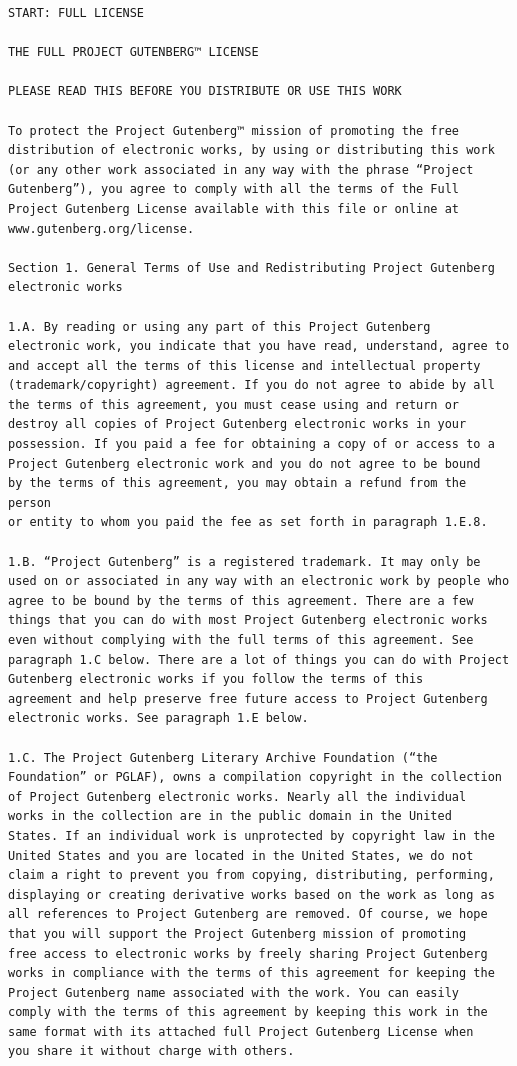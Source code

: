 \documentclass{article}
\begin{document}
\begin{verbatim}
START: FULL LICENSE

THE FULL PROJECT GUTENBERG™ LICENSE

PLEASE READ THIS BEFORE YOU DISTRIBUTE OR USE THIS WORK

To protect the Project Gutenberg™ mission of promoting the free
distribution of electronic works, by using or distributing this work
(or any other work associated in any way with the phrase “Project
Gutenberg”), you agree to comply with all the terms of the Full
Project Gutenberg License available with this file or online at
www.gutenberg.org/license.

Section 1. General Terms of Use and Redistributing Project Gutenberg
electronic works

1.A. By reading or using any part of this Project Gutenberg
electronic work, you indicate that you have read, understand, agree to
and accept all the terms of this license and intellectual property
(trademark/copyright) agreement. If you do not agree to abide by all
the terms of this agreement, you must cease using and return or
destroy all copies of Project Gutenberg electronic works in your
possession. If you paid a fee for obtaining a copy of or access to a
Project Gutenberg electronic work and you do not agree to be bound
by the terms of this agreement, you may obtain a refund from the person
or entity to whom you paid the fee as set forth in paragraph 1.E.8.

1.B. “Project Gutenberg” is a registered trademark. It may only be
used on or associated in any way with an electronic work by people who
agree to be bound by the terms of this agreement. There are a few
things that you can do with most Project Gutenberg electronic works
even without complying with the full terms of this agreement. See
paragraph 1.C below. There are a lot of things you can do with Project
Gutenberg electronic works if you follow the terms of this
agreement and help preserve free future access to Project Gutenberg
electronic works. See paragraph 1.E below.

1.C. The Project Gutenberg Literary Archive Foundation (“the
Foundation” or PGLAF), owns a compilation copyright in the collection
of Project Gutenberg electronic works. Nearly all the individual
works in the collection are in the public domain in the United
States. If an individual work is unprotected by copyright law in the
United States and you are located in the United States, we do not
claim a right to prevent you from copying, distributing, performing,
displaying or creating derivative works based on the work as long as
all references to Project Gutenberg are removed. Of course, we hope
that you will support the Project Gutenberg mission of promoting
free access to electronic works by freely sharing Project Gutenberg
works in compliance with the terms of this agreement for keeping the
Project Gutenberg name associated with the work. You can easily
comply with the terms of this agreement by keeping this work in the
same format with its attached full Project Gutenberg License when
you share it without charge with others.


\end{verbatim}
\end{document}
